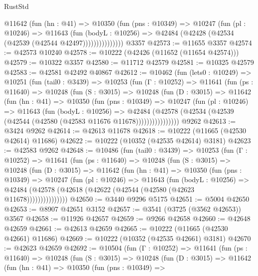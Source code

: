 \begin{lexlean}{RustStd}
\begin{coremodule}
                @11642
                  (fun (hn : @41) =>
                  @10350
                    (fun (pns : @10349) =>
                    @10247
                      (fun (pl : @10246) =>
                      @11643
                        (fun (bodyL : @10256) =>
                        @42484 (@42428 (@42534 (@42539 (@42544 @42497)))))))))))))))
    @3357
@42573 := @11655 @3357
@42574 := @42573 @10240
@42578 := @10222 (@42426 (@11652 (@11654 @42574)))
@42579 := @10322 @3357
@42580 := @11712 @42579
@42581 := @10325 @42579
@42583 := @42581 @42492 @40867
@42612 := @10462
    (fun (lets0 : @10249) =>
    @10251
      (fun (tail0 : @3439) =>
      @10253
        (fun (Γ : @10252) =>
        @11641
          (fun (ps : @11640) =>
          @10248
            (fun (S : @3015) =>
            @10248
              (fun (D : @3015) =>
              @11642
                (fun (hn : @41) =>
                @10350
                  (fun (pns : @10349) =>
                  @10247
                    (fun (pl : @10246) =>
                    @11643
                      (fun (bodyL : @10256) =>
                      @42484
                        (@42578
                          (@42534 (@42539 (@42544 (@42580 (@42583 @11676 @11678))))))))))))))))
    @9262
@42613 := @3424 @9262
@42614 := @42613 @11678
@42618 := @10222 (@11665 (@42530 @42614) @11686)
@42622 := @10222 (@10352 (@42535 @42614) @3181)
@42623 := @42583 @9262
@42648 := @10486
    (fun (tail0 : @3439) =>
    @10253
      (fun (Γ : @10252) =>
      @11641
        (fun (ps : @11640) =>
        @10248
          (fun (S : @3015) =>
          @10248
            (fun (D : @3015) =>
            @11642
              (fun (hn : @41) =>
              @10350
                (fun (pns : @10349) =>
                @10247
                  (fun (pl : @10246) =>
                  @11643
                    (fun (bodyL : @10256) =>
                    @42484 (@42578 (@42618 (@42622 (@42544 (@42580 (@42623 @11678)))))))))))))))
@42650 := @3440 @9296 @5175
@42651 := @5004 @42650
@42653 := @8907 @42651 @3152
@42657 := @3541 (@3725 (@3562 @42653)) @3567
@42658 := @11926 @42657
@42659 := @9266 @42658
@42660 := @42648 @42659
@42661 := @42613 @42659
@42665 := @10222 (@11665 (@42530 @42661) @11686)
@42669 := @10222 (@10352 (@42535 @42661) @3181)
@42670 := @42623 @42659
@42692 := @10504
    (fun (Γ : @10252) =>
    @11641
      (fun (ps : @11640) =>
      @10248
        (fun (S : @3015) =>
        @10248
          (fun (D : @3015) =>
          @11642
            (fun (hn : @41) =>
            @10350
              (fun (pns : @10349) =>

\end{coremodule}
\end{lexlean}
